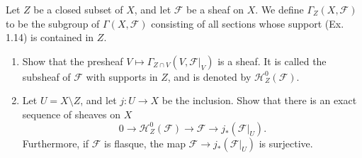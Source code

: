 \begin{exercise}%
	Let $Z $ be a closed subset of $X $, and let $\mathscr{F}$ be a sheaf on $X $. We define $\Gamma_Z(X,\mathscr{F}) $ to be the subgroup of $\Gamma(X,\mathscr{F}) $ consisting of all sections whose support (Ex. 1.14) is contained in $Z $.
	\begin{enumerate}
		\item Show that the presheaf $V\mapsto \Gamma_{Z\cap V}(V,\mathscr{F}|_V) $ is a sheaf. It is called the subsheaf of $\mathscr{F} $ with supports in $Z $, and is denoted by $\mathscr{H}_Z^0(\mathscr{F}) $.
		\item Let $U = X \setminus Z $, and let $j: U\to X $ be the inclusion. Show that there is an exact sequence of sheaves on $X $
			\[
				0 \to \mathscr{H}_Z^0(\mathscr{F}) \to \mathscr{F} \to j_\ast(\mathscr{F}|_U)
			.\] 
			Furthermore, if $\mathscr{F} $ is flasque, the map $\mathscr{F}\to j_\ast(\mathscr{F}|_U) $ is surjective.
	\end{enumerate}
\end{exercise}
